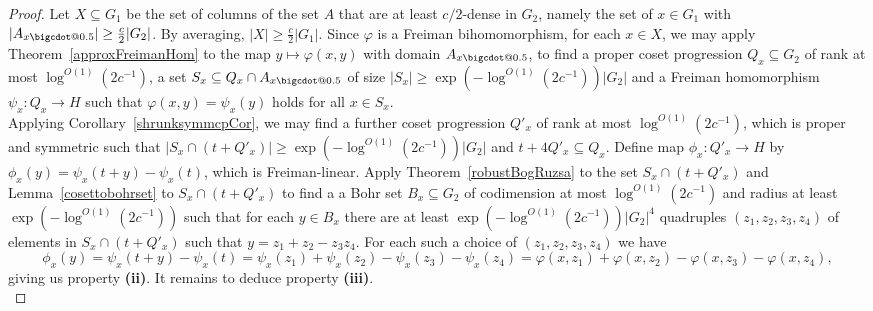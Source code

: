 \documentclass[a4paper,11pt]{article}
\makeatletter
\numberwithin{theorem}{section}
\theoremstyle{definition}
\newcommand*\bcdot{\mathpalette\bigcdot@{0.5}}
\newcommand*\bigcdot@[2]{\mathbin{\vcenter{\hbox{\scalebox{#2}{$\m@th#1\bullet$}}}}}
\makeatother
\begin{document}
\begin{proof}
    Let $X \subseteq G_1$ be the set of columns of the set $A$ that are at least $c/2$-dense in $G_2$, namely the set of $x \in G_1$ with $|A_{x \bcdot}| \geq \frac{c}{2}|G_2|$. By averaging, $|X| \geq \frac{c}{2}|G_1|$. Since $\varphi$ is a Freiman bihomomorphism, for each $x \in X$, we may apply Theorem~\ref{approxFreimanHom} to the map $y \mapsto \varphi(x,y)$ with domain $A_{x \bcdot}$,  to find a proper coset progression $Q_x \subseteq G_2$ of rank at most $\log^{O(1)} (2c^{-1})$, a set $S_x \subseteq Q_x \cap A_{x \bcdot}$ of size $|S_x| \geq \exp(-\log^{O(1)} (2c^{-1})) |G_2|$ and a Freiman homomorphism $\psi_x \colon Q_x \to H$ such that $\varphi(x, y) = \psi_x(y)$ holds for all $x \in S_x$.\\
    \indent Applying Corollary~\ref{shrunksymmcpCor}, we may find a further coset progression $Q'_x$ of rank at most $\log^{O(1)} (2c^{-1})$, which is proper and symmetric such that $|S_x \cap (t + Q'_x)| \geq \exp(-\log^{O(1)} (2c^{-1})) |G_2|$ and $t + 4Q'_x \subseteq Q_x$. Define map $\phi_x : Q'_x \to H$ by $\phi_x(y) = \psi_x(t + y) - \psi_x(t)$, which is Freiman-linear. Apply Theorem~\ref{robustBogRuzsa} to the set $S_x \cap (t + Q'_x)$ and Lemma~\ref{cosettobohrset} to $S_x \cap (t + Q'_x)$ to find a 
    a Bohr set $B_x \subseteq G_2$ of codimension at most $\log^{O(1)} (2c^{-1})$ and radius at least $\exp(-\log^{O(1)} (2c^{-1}))$ such that for each $y \in B_x$ there are at least $\exp(-\log^{O(1)} (2c^{-1})) |G_2|^4$ quadruples $(z_1, z_2, z_3, z_4)$ of elements in $ S_x \cap (t + Q'_x)$ such that $y = z_1 + z_2 - z_3 z_4$. For each such a choice of $(z_1, z_2, z_3, z_4)$ we have
    \[\phi_x(y) = \psi_x(t + y) - \psi_x(t) = \psi_x(z_1) + \psi_x(z_2) - \psi_x(z_3) - \psi_x(z_4) = \varphi(x, z_1) + \varphi(x, z_2) - \varphi(x, z_3) - \varphi(x, z_4),\]
    giving us property \textbf{(ii)}. It remains to deduce property \textbf{(iii)}.\\
    

\end{proof}
\end{document}
